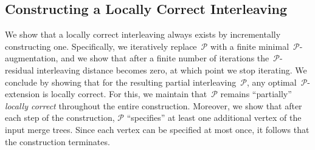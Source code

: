 \documentclass[a4paper,UKenglish, autoref, thm-restate, cleveref]{lipics-v2021}
\renewcommand{\P}{\mathcal{P}}
\begin{document}
\subsection{Constructing a Locally Correct Interleaving}\label{sec:locally-correct-partial-merge-tree-matchings}
We show that a locally correct interleaving always exists by incrementally constructing one.
Specifically, we iteratively replace~$\P$ with a finite minimal~$\P$-augmentation, and we show that after a finite number of iterations the~$\P$-residual interleaving distance becomes zero, at which point we stop iterating.
We conclude by showing that for the resulting partial interleaving~$\P$, any optimal~$\P$-extension is locally correct.
For this, we maintain that~$\P$ remains ``partially'' \emph{locally correct} throughout the entire construction.
Moreover, we show that after each step of the construction, $\P$ ``specifies'' at least one additional vertex of the input merge trees.
Since each vertex can be specified at most once, it follows that the construction terminates.
\end{document}
